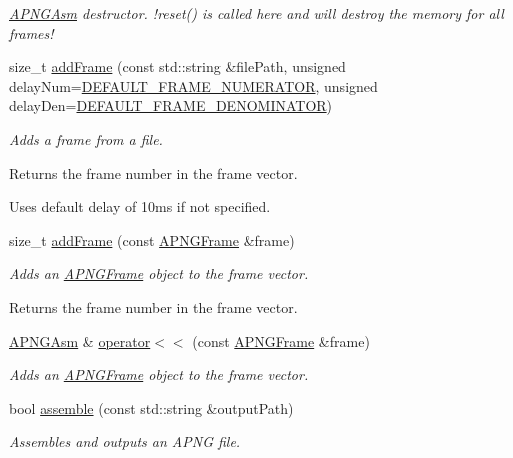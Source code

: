 \begin{DoxyCompactItemize}
\begin{DoxyCompactList}\small\item\em \hyperlink{classapngasm_1_1APNGAsm}{A\-P\-N\-G\-Asm} destructor. !reset() is called here and will destroy the memory for all frames! \end{DoxyCompactList}\item 
size\-\_\-t \hyperlink{classapngasm_1_1APNGAsm_a937cbf8260ee5ce8ae1a589fb07e357f}{add\-Frame} (const std\-::string \&file\-Path, unsigned delay\-Num=\hyperlink{namespaceapngasm_a5b334b6957e14291ff8f76cab562f60f}{D\-E\-F\-A\-U\-L\-T\-\_\-\-F\-R\-A\-M\-E\-\_\-\-N\-U\-M\-E\-R\-A\-T\-O\-R}, unsigned delay\-Den=\hyperlink{namespaceapngasm_a867b3acbcc2624faf6b3e82732110594}{D\-E\-F\-A\-U\-L\-T\-\_\-\-F\-R\-A\-M\-E\-\_\-\-D\-E\-N\-O\-M\-I\-N\-A\-T\-O\-R})
\begin{DoxyCompactList}\small\item\em Adds a frame from a file.\par
 Returns the frame number in the frame vector.\par
 Uses default delay of 10ms if not specified. \end{DoxyCompactList}\item 
size\-\_\-t \hyperlink{classapngasm_1_1APNGAsm_ab90be230c206a50f9b2cb9ff64f932bc}{add\-Frame} (const \hyperlink{classapngasm_1_1APNGFrame}{A\-P\-N\-G\-Frame} \&frame)
\begin{DoxyCompactList}\small\item\em Adds an \hyperlink{classapngasm_1_1APNGFrame}{A\-P\-N\-G\-Frame} object to the frame vector.\par
 Returns the frame number in the frame vector. \end{DoxyCompactList}\item 
\hyperlink{classapngasm_1_1APNGAsm}{A\-P\-N\-G\-Asm} \& \hyperlink{classapngasm_1_1APNGAsm_ad3c3260ad6a8b004ccb955c9425d5053}{operator$<$$<$} (const \hyperlink{classapngasm_1_1APNGFrame}{A\-P\-N\-G\-Frame} \&frame)
\begin{DoxyCompactList}\small\item\em Adds an \hyperlink{classapngasm_1_1APNGFrame}{A\-P\-N\-G\-Frame} object to the frame vector. \end{DoxyCompactList}\item 
bool \hyperlink{classapngasm_1_1APNGAsm_ae2d72070a6f76248e717c027c2c19bbd}{assemble} (const std\-::string \&output\-Path)
\begin{DoxyCompactList}\small\item\em Assembles and outputs an A\-P\-N\-G file.\par

\end{DoxyCompactList}
\end{DoxyCompactItemize}
